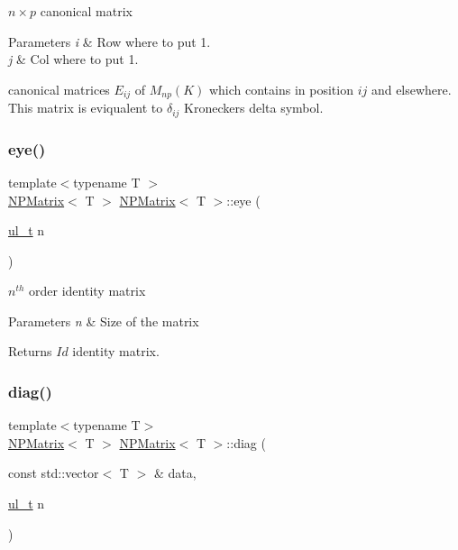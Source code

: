 $ n \times p $ canonical matrix 


\begin{DoxyParams}{Parameters}
{\em i} & Row where to put 1. \\
\hline
{\em j} & Col where to put 1.\\
\hline
\end{DoxyParams}
canonical matrices $ E_{ij} $ of $ M_{np}(K) $ which contains {} in position $ ij $ and {} elsewhere. This matrix is eviqualent to $ \delta_{ij} $ Kronecker\textquotesingle{}s delta symbol. \mbox{\label{class_n_p_matrix_a38961696b973ca0ff6ac098580c6974f}} 
\subsubsection{\texorpdfstring{eye()}{eye()}}
{\footnotesize\ttfamily template$<$typename T $>$ \\
\mbox{\hyperlink{class_n_p_matrix}{N\+P\+Matrix}}$<$ T $>$ \mbox{\hyperlink{class_n_p_matrix}{N\+P\+Matrix}}$<$ T $>$\+::eye (\begin{DoxyParamCaption}\item[{\mbox{\hyperlink{typedef_8h_a1b140a2034db3f5dfe18a987745df43a}{ul\+\_\+t}}}]{n }\end{DoxyParamCaption})\hspace{0.3cm}{\ttfamily [static]}}



$ n^{th} $ order identity matrix 


\begin{DoxyParams}{Parameters}
{\em n} & Size of the matrix \\
\hline
\end{DoxyParams}
\begin{DoxyReturn}{Returns}
$ Id $ identity matrix. 
\end{DoxyReturn}
\mbox{\label{class_n_p_matrix_ae73ef1ba99fe04c35af30adc3bfbd1dc}} 
\subsubsection{\texorpdfstring{diag()}{diag()}}
{\footnotesize\ttfamily template$<$typename T$>$ \\
\mbox{\hyperlink{class_n_p_matrix}{N\+P\+Matrix}}$<$ T $>$ \mbox{\hyperlink{class_n_p_matrix}{N\+P\+Matrix}}$<$ T $>$\+::diag (\begin{DoxyParamCaption}\item[{const std\+::vector$<$ T $>$ \&}]{data,  }\item[{\mbox{\hyperlink{typedef_8h_a1b140a2034db3f5dfe18a987745df43a}{ul\+\_\+t}}}]{n }\end{DoxyParamCaption})\hspace{0.3cm}{\ttfamily [static]}}



